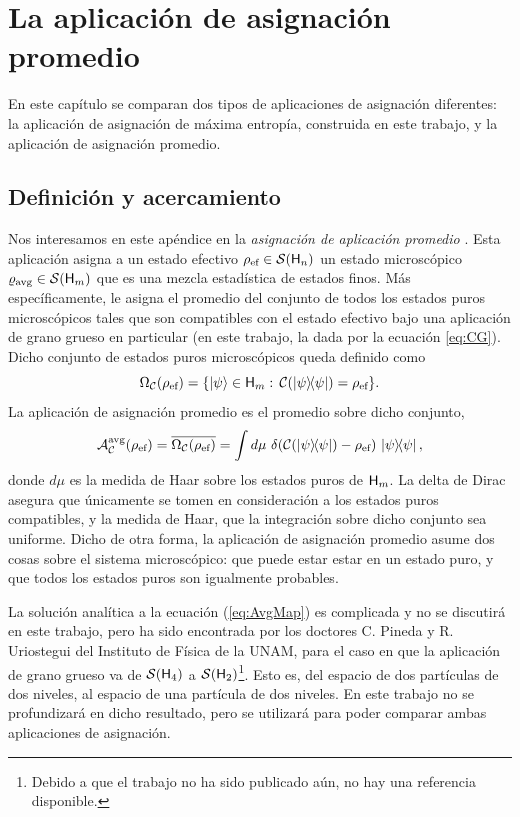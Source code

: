 \chapter{La aplicación de asignación promedio}\label{ch:5}

En este capítulo se comparan dos tipos de aplicaciones de asignación diferentes: la aplicación de asignación de máxima entropía, construida en este trabajo, y la aplicación de asignación promedio.

\section{Definición y acercamiento}




Nos interesamos en este apéndice en la \textit{asignación de aplicación promedio} \cite{Macro-To-Micro}. Esta aplicación asigna a un estado efectivo $\rho_{\text{ef}} \in \mathcal{S}({\sf H}_{n})$ un estado microscópico $\varrho_{\text{avg}} \in \mathcal{S}({\sf H}_{m})$ que es una mezcla estadística de estados finos. Más específicamente, le asigna el promedio del conjunto de todos los estados puros microscópicos tales que son compatibles con el estado efectivo bajo una aplicación de grano grueso en particular (en este trabajo, la dada por la ecuación \ref{eq:CG}). Dicho conjunto de estados puros microscópicos queda definido como
\begin{equation}\label{eq:Omega}
    \Omega_{\mcC}(\rho_{\ef}) = \{\ket{\psi}\in\hilbert_{m}:\, \mcC(\dyad{\psi}) = \rho_{\ef}  \}.
\end{equation}
La aplicación de asignación promedio es el promedio sobre dicho conjunto, \ie 
\begin{equation}\label{eq:AvgMap}
    \mcA_{\mcC}^{\avg}(\rho_{\ef}) = \overline{\Omega_{\mcC}(\rho_{\ef})} = \int d \mu\,\, \delta(\mcC(\dyad{\psi})-\rho_{\ef})\,\dyad{\psi},
\end{equation}
donde $d\mu$ es la medida de Haar sobre los estados puros de ${\sf H}_{m}$. La delta de Dirac asegura que únicamente se tomen en consideración a los estados puros compatibles, y la medida de Haar, que la integración sobre dicho conjunto sea uniforme. Dicho de otra forma, la aplicación de asignación promedio asume dos cosas sobre el sistema microscópico: que puede estar estar en un estado puro, y que todos los estados puros son igualmente probables.

La solución analítica a la ecuación (\ref{eq:AvgMap}) es complicada y no se discutirá en este trabajo, pero ha sido encontrada por los doctores C. Pineda y R. Uriostegui del Instituto de Física de la UNAM, para el caso en que la aplicación de grano grueso va de $\mathcal{S}({\sf H}_{4})$ a $\mathcal{S}({\sf H}_{2})$\footnote{Debido a que el trabajo no ha sido publicado aún, no hay una referencia disponible.}. Esto es, del espacio de dos partículas de dos niveles, al espacio de una partícula de dos niveles. En este trabajo no se profundizará en dicho resultado, pero se utilizará para poder comparar ambas aplicaciones de asignación.

